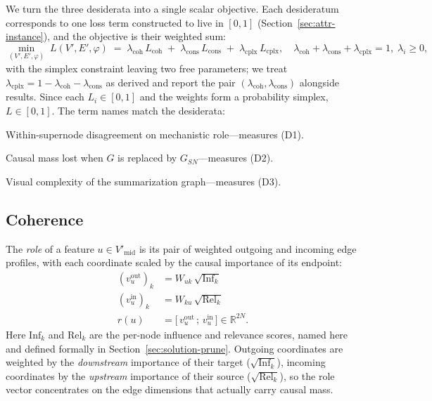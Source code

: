 We turn the three desiderata into a single scalar objective. Each
desideratum corresponds to one loss term constructed to live in
$[0, 1]$ (Section~\ref{sec:attr-instance}), and the objective is their
weighted sum:
\begin{equation}
\min_{(V', E', \varphi)}\;
L(V', E', \varphi)
\;=\;
\lambda_{\text{coh}}\, L_{\text{coh}}
\;+\;
\lambda_{\text{cons}}\, L_{\text{cons}}
\;+\;
\lambda_{\text{cplx}}\, L_{\text{cplx}},
\quad
\lambda_{\text{coh}} + \lambda_{\text{cons}} + \lambda_{\text{cplx}} = 1,\;
\lambda_i \ge 0,
\label{eq:Lsum}
\end{equation}
with the simplex constraint leaving two free parameters;
we treat $\lambda_{\text{cplx}} = 1 - \lambda_{\text{coh}} -
\lambda_{\text{cons}}$ as derived and report the pair
$(\lambda_{\text{coh}}, \lambda_{\text{cons}})$ alongside results.
Since each $L_i \in [0,1]$ and the weights form a probability simplex,
$L \in [0, 1]$. The term names match the desiderata:
\begin{description}[leftmargin=2.0em,style=nextline,topsep=2pt,itemsep=2pt]
\item[$L_{\text{coh}}(\varphi;\, V', E')$.] Within-supernode disagreement
on mechanistic role---measures (D1).
\item[$L_{\text{cons}}(V', E', \varphi;\, G)$.] Causal mass lost when
$G$ is replaced by $G_{SN}$---measures (D2).
\item[$L_{\text{cplx}}(V', E', \varphi)$.] Visual complexity of the
summarization graph---measures (D3).
\end{description}

\subsection{Coherence}\label{sec:attr-coh}

The \emph{role} of a feature $u \in V'_{\text{mid}}$ is its pair of
weighted outgoing and incoming edge profiles, with each coordinate
scaled by the causal importance of its endpoint:
\begin{align}
(v_u^{\text{out}})_k &= W_{uk}\,\sqrt{\mathrm{Inf}_k} \nonumber \\
(v_u^{\text{in}})_k  &= W_{ku}\,\sqrt{\mathrm{Rel}_k} \nonumber \\
r(u) &= \bigl[\,v_u^{\text{out}}\,;\, v_u^{\text{in}}\,\bigr] \in \mathbb{R}^{2N}.
\label{eq:role}
\end{align}
Here $\mathrm{Inf}_k$ and $\mathrm{Rel}_k$ are the per-node influence
and relevance scores, named here and defined formally in
Section~\ref{sec:solution-prune}. Outgoing coordinates are weighted by
the \emph{downstream} importance of their target
($\sqrt{\mathrm{Inf}_k}$), incoming coordinates by the \emph{upstream}
importance of their source ($\sqrt{\mathrm{Rel}_k}$), so the role vector
concentrates on the edge dimensions that actually carry causal mass.

